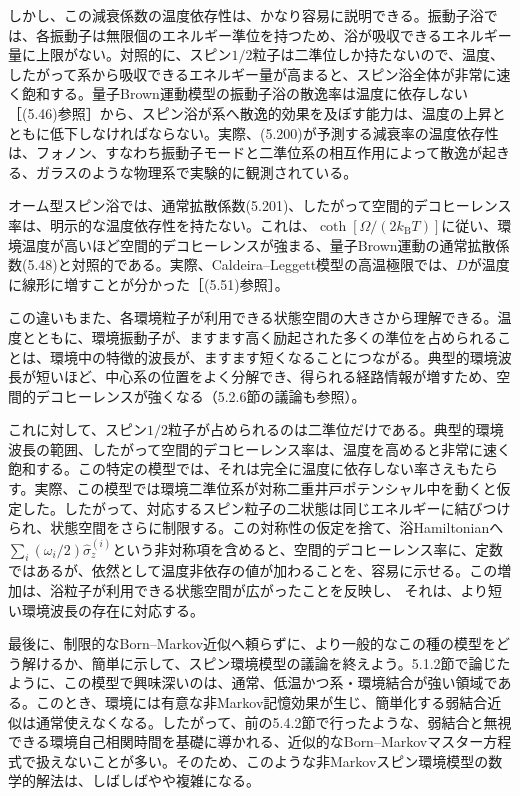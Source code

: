 しかし、この減衰係数の温度依存性は、かなり容易に説明できる。振動子浴では、各振動子は無限個のエネルギー準位を持つため、浴が吸収できるエネルギー量に上限がない。対照的に、スピン$1/2$粒子は二準位しか持たないので、温度、したがって系から吸収できるエネルギー量が高まると、スピン浴全体が非常に速く飽和する。量子Brown運動模型の振動子浴の散逸率は温度に依存しない［(5.46)参照］から、スピン浴が系へ散逸的効果を及ぼす能力は、温度の上昇とともに低下しなければならない。実際、(5.200)が予測する減衰率の温度依存性は、フォノン、すなわち振動子モードと二準位系の相互作用によって散逸が起きる\cite{ref245}、ガラスのような物理系で実験的に観測されている\cite{ref244}。

オーム型スピン浴では、通常拡散係数(5.201)、したがって空間的デコヒーレンス率は、明示的な温度依存性を持たない。これは、$\coth[\Omega/(2k_{\mathrm B}T)]$に従い、環境温度が高いほど空間的デコヒーレンスが強まる、量子Brown運動の通常拡散係数(5.48)と対照的である。実際、Caldeira--Leggett模型の高温極限では、$D$が温度に線形に増すことが分かった［(5.51)参照］。

この違いもまた、各環境粒子が利用できる状態空間の大きさから理解できる。温度とともに、環境振動子が、ますます高く励起された多くの準位を占められることは、環境中の特徴的波長が、ますます短くなることにつながる。典型的環境波長が短いほど、中心系の位置をよく分解でき、得られる経路情報が増すため、空間的デコヒーレンスが強くなる（5.2.6節の議論も参照）。

これに対して、スピン$1/2$粒子が占められるのは二準位だけである。典型的環境波長の範囲、したがって空間的デコヒーレンス率は、温度を高めると非常に速く飽和する。この特定の模型では、それは完全に温度に依存しない率さえもたらす。実際、この模型では環境二準位系が対称二重井戸ポテンシャル中を動くと仮定した。したがって、対応するスピン粒子の二状態は同じエネルギーに結びつけられ、状態空間をさらに制限する。この対称性の仮定を捨て、浴Hamiltonianへ$\sum_i(\omega_i/2)\hat\sigma_z^{(i)}$という非対称項を含めると、空間的デコヒーレンス率に、定数ではあるが、依然として温度非依存の値が加わることを、容易に示せる。この増加は、浴粒子が利用できる状態空間が広がったことを反映し、
\hypertarget{srcpage:237}{}\label{srcpage:237}
それは、より短い環境波長の存在に対応する。

最後に、制限的なBorn--Markov近似へ頼らずに、より一般的なこの種の模型をどう解けるか、簡単に示して、スピン環境模型の議論を終えよう。5.1.2節で論じたように、この模型で興味深いのは、通常、低温かつ系・環境結合が強い領域である。このとき、環境には有意な非Markov記憶効果が生じ、簡単化する弱結合近似は通常使えなくなる。したがって、前の5.4.2節で行ったような、弱結合と無視できる環境自己相関時間を基礎に導かれる、近似的なBorn--Markovマスター方程式で扱えないことが多い。そのため、このような非Markovスピン環境模型の数学的解法は、しばしばやや複雑になる。

